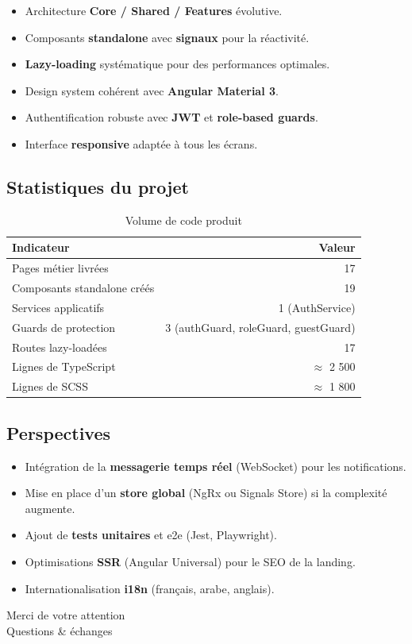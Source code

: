 \documentclass[11pt,a4paper]{article}
\begin{document}
\begin{itemize}
  \item Architecture \textbf{Core / Shared / Features} évolutive.
  \item Composants \textbf{standalone} avec \textbf{signaux} pour la réactivité.
  \item \textbf{Lazy-loading} systématique pour des performances optimales.
  \item Design system cohérent avec \textbf{Angular Material 3}.
  \item Authentification robuste avec \textbf{JWT} et \textbf{role-based guards}.
  \item Interface \textbf{responsive} adaptée à tous les écrans.
\end{itemize}

\subsection{Statistiques du projet}

\begin{table}[H]
\centering
\renewcommand{\arraystretch}{1.5}
\begin{tabularx}{\textwidth}{Xr}
\toprule
\rowcolor{primary!10}
\textbf{Indicateur} & \textbf{Valeur} \\
\midrule
Pages métier livrées & 17 \\
Composants standalone créés & 19 \\
Services applicatifs & 1 (AuthService) \\
Guards de protection & 3 (authGuard, roleGuard, guestGuard) \\
Routes lazy-loadées & 17 \\
Lignes de TypeScript & $\approx$ 2 500 \\
Lignes de SCSS & $\approx$ 1 800 \\
\bottomrule
\end{tabularx}
\caption{Volume de code produit}
\end{table}

\subsection{Perspectives}

\begin{itemize}
  \item Intégration de la \textbf{messagerie temps réel} (WebSocket) pour les notifications.
  \item Mise en place d'un \textbf{store global} (NgRx ou Signals Store) si la complexité augmente.
  \item Ajout de \textbf{tests unitaires} et e2e (Jest, Playwright).
  \item Optimisations \textbf{SSR} (Angular Universal) pour le SEO de la landing.
  \item Internationalisation \textbf{i18n} (français, arabe, anglais).
\end{itemize}

\vspace{1cm}

\begin{tcolorbox}[
  enhanced, colback=primary, colframe=primary,
  arc=12pt, drop shadow,
  fontupper=\color{white}\large\bfseries,
  halign=center
]
Merci de votre attention\\[0.2cm]
\normalfont\normalsize Questions \& échanges
\end{tcolorbox}
\end{document}

